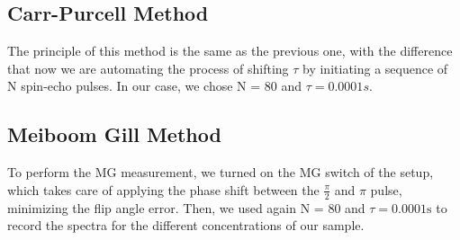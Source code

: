 \documentclass[12pt]{article}
\begin{document}
\subsection{Carr-Purcell Method}
The principle of this method is the same as the previous one, with the difference that now we are automating the process of shifting $\tau$ by initiating a sequence of N spin-echo pulses.
In our case, we chose N = 80 and $\tau = 0.0001s$.



\subsection{Meiboom Gill Method}
To perform the MG measurement, we turned on the MG switch of the setup, which takes care of applying the phase shift between the $\frac{\pi}{2}$ and $\pi$ pulse, minimizing the flip angle error. Then, we used again N = 80 and $\tau = 0.0001 \text{s}$ to record the spectra for the different concentrations of our sample.
\end{document}
